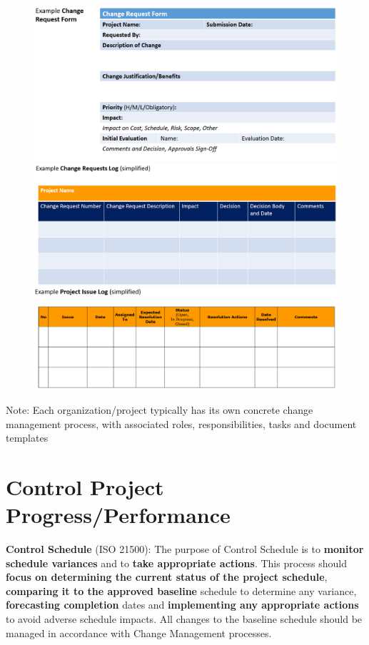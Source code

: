 \documentclass[]{project_plan}
\begin{document}
\newpage

\begin{figure}[h!]
  \centering
  \includegraphics[width=\linewidth]{change_request_form.png}
  \includegraphics[width=\linewidth]{change_requests_log.png}
  \includegraphics[width=\linewidth]{project_issue_log.png}
\end{figure}

Note: Each organization/project typically has its own concrete change management process, with
associated roles, responsibilities, tasks and document templates

\newpage

\section{Control Project Progress/Performance}

\textbf{Control Schedule} (ISO 21500): The purpose of Control Schedule is to \textbf{monitor schedule variances} and to \textbf{take
  appropriate actions}. This process should \textbf{focus on determining the current status of the project schedule},
\textbf{comparing it to the approved baseline} schedule to determine any variance, \textbf{forecasting completion} dates and
\textbf{implementing any appropriate actions} to avoid adverse schedule impacts. All changes to the baseline schedule
should be managed in accordance with Change Management processes.
\end{document}
